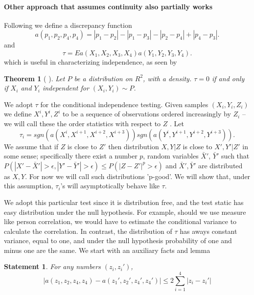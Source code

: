 \documentclass{article}
\newtheorem{Theorem}{Theorem}
\newtheorem{statement}{Statement}
\begin{document}
\paragraph{Other approach that assumes continuity also partially works}

Following \cite{bergsma2014consistent} we define a discrepancy function
\begin{equation}
a(p_1,p_2,p_4,p_4) = |p_1-p_2| -|p_1-p_3|-|p_2-p_4|+|p_4-p_3|.
\end{equation}
and 
\begin{equation}
\tau = Ea(X_1,X_2,X_3,X_4)a(Y_1,Y_2,Y_3,Y_4).
\end{equation}
which is useful in characterizing independence, as seen by 
\begin{Theorem}[\cite{bergsma2014consistent} ]
\label{th:tau_star}
Let $P$ be a distribution on $R^2$, with a density.  $\tau = 0$ if and only if $X_i$ and $Y_i$ independent for  $(X_i,Y_i) \sim P$. 
\end{Theorem}

We adopt $\tau$ for the conditional independence testing. Given samples $(X_i,Y_i,Z_i)$ we define  $X^{i},Y^{i},Z^{i}$ to be a sequence of observations ordered increasingly by $Z_i$ -- we will call these the order statistics with respect to $Z$ . Let
 \[ 
\tau_i = sgn(a(X^{i},X^{i+1},X^{i+2},X^{i+3})) sgn(a(Y^{i},Y^{i+1},Y^{i+2},Y^{i+3})).  
 \]
We assume that if $Z$ is close to $Z'$ then  distribution $X,Y|Z$ is close to  $X',Y'|Z'$ in some sense; specifically  there exist a number $p$,  random variables  $\bar X'$, $\bar Y'$ such that $P( |X'- \bar X'|>\epsilon,|Y'- \bar Y'|>\epsilon  ) \leq P(|Z-Z'|^p>\epsilon)$ and $\bar X', \bar Y'$ are distributed as $X,Y$. For now we will call such distributions 'p-good'. We will show that, under this assumption, $\tau_i$'s will asymptotically behave like $\tau$.   

We adopt this particular test since it is distribution free, and the test static has easy distribution under the null hypothesis. For example, should we use measure like person correlation, we would have to estimate the conditional variance to calculate the correlation. In contrast, the distribution of $\tau$ has aways constant variance, equal to one, and under the null hypothesis probability of one and minus one are the same.  We start with an auxiliary facts and lemma
\begin{statement}
\label{lem:err}
For any numbers $(z_i,z_i')$, 
\[
| a(z_1,z_2,z_4,z_4) -  a(z_1',z_2',z_4',z_4')| \leq 2\sum_{i=1}^4 |z_i-z_i'|
\]
\end{statement}
\end{document}
